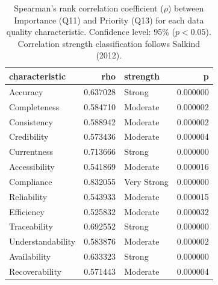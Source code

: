 \begin{table}[t]
  \caption{Spearman's rank correlation coefficient ($\rho$) between Importance (Q11) and Priority (Q13) for each data quality characteristic. Confidence level: 95\% ($p < 0.05$). Correlation strength classification follows Salkind (2012).}
  \label{tab:spearman-imp-pri}
  \centering
  \small
\begin{tabular}{lrlr}
\toprule
characteristic & rho & strength & p \\
\midrule
Accuracy & 0.637028 & Strong & 0.000000 \\
Completeness & 0.584710 & Moderate & 0.000002 \\
Consistency & 0.588942 & Moderate & 0.000002 \\
Credibility & 0.573436 & Moderate & 0.000004 \\
Currentness & 0.713666 & Strong & 0.000000 \\
Accessibility & 0.541869 & Moderate & 0.000016 \\
Compliance & 0.832055 & Very Strong & 0.000000 \\
Reliability & 0.543933 & Moderate & 0.000015 \\
Efficiency & 0.525832 & Moderate & 0.000032 \\
Traceability & 0.692552 & Strong & 0.000000 \\
Understandability & 0.583876 & Moderate & 0.000002 \\
Availability & 0.633323 & Strong & 0.000000 \\
Recoverability & 0.571443 & Moderate & 0.000004 \\
\bottomrule
\end{tabular}
\end{table}
